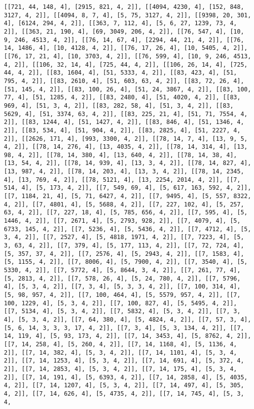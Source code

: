 \documentclass[12pt,fleqn]{article}\usepackage{../../common}
\begin{document}
\begin{verbatim}
[[721, 44, 148, 4], [2915, 821, 4, 2]], [[4094, 4230, 4], [152, 848, 3127, 4, 2]], [[4094, 8, 7, 4], [5, 75, 3127, 4, 2]], [[9398, 20, 301, 4], [6124, 294, 4, 2]], [[363, 7, 112, 4], [5, 6, 27, 1239, 73, 4, 2]], [[363, 21, 190, 4], [69, 3049, 206, 4, 2]], [[76, 547, 4], [10, 9, 246, 4513, 4, 2]], [[76, 14, 67, 4], [2294, 44, 21, 4, 2]], [[76, 14, 1486, 4], [10, 4128, 4, 2]], [[76, 17, 26, 4], [10, 5405, 4, 2]], [[76, 17, 21, 4], [10, 3703, 4, 2]], [[76, 599, 4], [10, 9, 246, 4513, 4, 2]], [[106, 32, 14, 4], [725, 44, 4, 2]], [[106, 26, 14, 4], [725, 44, 4, 2]], [[83, 1604, 4], [51, 5333, 4, 2]], [[83, 423, 4], [51, 795, 4, 2]], [[83, 2610, 4], [51, 603, 63, 4, 2]], [[83, 72, 26, 4], [51, 145, 4, 2]], [[83, 100, 26, 4], [51, 24, 3867, 4, 2]], [[83, 100, 77, 4], [51, 1285, 4, 2]], [[83, 2480, 4], [51, 4020, 4, 2]], [[83, 969, 4], [51, 3, 4, 2]], [[83, 282, 58, 4], [51, 3, 4, 2]], [[83, 5629, 4], [51, 3374, 63, 4, 2]], [[83, 225, 21, 4], [51, 71, 7554, 4, 2]], [[83, 1244, 4], [51, 1427, 4, 2]], [[83, 846, 4], [51, 1346, 4, 2]], [[83, 534, 4], [51, 904, 4, 2]], [[83, 2825, 4], [51, 2227, 4, 2]], [[2626, 171, 4], [993, 3300, 4, 2]], [[78, 14, 7, 4], [13, 9, 5, 4, 2]], [[78, 14, 276, 4], [13, 4035, 4, 2]], [[78, 14, 314, 4], [13, 98, 4, 2]], [[78, 14, 380, 4], [13, 640, 4, 2]], [[78, 14, 38, 4], [13, 54, 4, 2]], [[78, 14, 939, 4], [13, 3, 4, 2]], [[78, 14, 827, 4], [13, 987, 4, 2]], [[78, 14, 203, 4], [13, 3, 4, 2]], [[78, 14, 2345, 4], [13, 769, 4, 2]], [[78, 5121, 4], [13, 2254, 2014, 4, 2]], [[7, 514, 4], [5, 173, 4, 2]], [[7, 549, 69, 4], [5, 617, 163, 592, 4, 2]], [[7, 1184, 21, 4], [5, 71, 6427, 4, 2]], [[7, 9495, 4], [5, 557, 8322, 4, 2]], [[7, 4801, 4], [5, 5688, 4, 2]], [[7, 227, 102, 4], [5, 257, 63, 4, 2]], [[7, 227, 18, 4], [5, 785, 656, 4, 2]], [[7, 595, 4], [5, 1446, 4, 2]], [[7, 2671, 4], [5, 2793, 928, 2]], [[7, 4079, 4], [5, 6733, 145, 4, 2]], [[7, 5236, 4], [5, 5436, 4, 2]], [[7, 4712, 4], [5, 3, 4, 2]], [[7, 2527, 4], [5, 4818, 1971, 4, 2]], [[7, 7223, 4], [5, 3, 63, 4, 2]], [[7, 379, 4], [5, 177, 113, 4, 2]], [[7, 72, 724, 4], [5, 357, 37, 4, 2]], [[7, 2576, 4], [5, 2943, 4, 2]], [[7, 1583, 4], [5, 1155, 4, 2]], [[7, 8006, 4], [5, 7900, 4, 2]], [[7, 3540, 4], [5, 5330, 4, 2]], [[7, 5772, 4], [5, 8644, 3, 4, 2]], [[7, 261, 77, 4], [5, 2813, 4, 2]], [[7, 578, 26, 4], [5, 24, 780, 4, 2]], [[7, 5796, 4], [5, 3, 4, 2]], [[7, 3, 4], [5, 3, 3, 4, 2]], [[7, 100, 314, 4], [5, 98, 957, 4, 2]], [[7, 100, 464, 4], [5, 5579, 957, 4, 2]], [[7, 100, 1229, 4], [5, 3, 4, 2]], [[7, 100, 827, 4], [5, 5495, 4, 2]], [[7, 5134, 4], [5, 3, 4, 2]], [[7, 5832, 4], [5, 3, 4, 2]], [[7, 3, 4], [5, 3, 4, 2]], [[7, 64, 380, 4], [5, 4824, 4, 2]], [[7, 57, 3, 4], [5, 6, 14, 3, 3, 3, 17, 4, 2]], [[7, 3, 4], [5, 3, 134, 4, 2]], [[7, 14, 119, 4], [5, 93, 173, 4, 2]], [[7, 14, 3453, 4], [5, 8762, 4, 2]], [[7, 14, 258, 4], [5, 260, 4, 2]], [[7, 14, 1168, 4], [5, 1136, 4, 2]], [[7, 14, 382, 4], [5, 3, 4, 2]], [[7, 14, 1101, 4], [5, 3, 4, 2]], [[7, 14, 1253, 4], [5, 3, 4, 2]], [[7, 14, 691, 4], [5, 372, 4, 2]], [[7, 14, 2853, 4], [5, 3, 4, 2]], [[7, 14, 175, 4], [5, 3, 4, 2]], [[7, 14, 191, 4], [5, 6393, 4, 2]], [[7, 14, 2858, 4], [5, 4035, 4, 2]], [[7, 14, 1207, 4], [5, 3, 4, 2]], [[7, 14, 497, 4], [5, 305, 4, 2]], [[7, 14, 626, 4], [5, 4735, 4, 2]], [[7, 14, 745, 4], [5, 3, 4, 
\end{verbatim}
\end{document}
